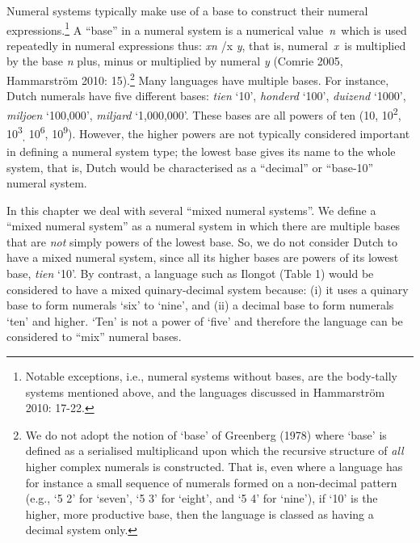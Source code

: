 Numeral systems typically make use of a base to construct their numeral expressions.\footnote{Notable exceptions, i.e., numeral systems without bases, are the body-tally systems mentioned above, and the languages discussed in Hammarstr\"om 2010: 17-22.} A {\textquotedblleft}base{\textquotedblright} in a numeral system is a numerical value~\textit{n~}which is used repeatedly in numeral expressions thus: \textit{xn {\textpm}}/x\textit{ y}, that is, numeral~\textit{x}~is multiplied by the base \textit{n} plus, minus or multiplied by numeral \textit{y} (Comrie 2005, Hammarstr\"om 2010: 15).\footnote{We do not adopt the notion of {\textquoteleft}base{\textquoteright} of Greenberg (1978) where {\textquoteleft}base{\textquoteright} is defined as a serialised multiplicand upon which the recursive structure of \textit{all} higher complex numerals is constructed. That is, even where a language has for instance a small sequence of numerals formed on a non-decimal pattern (e.g., {\textquoteleft}5 2{\textquoteright} for {
\textquoteleft}seven{\textquoteright}, {\textquoteleft}5 3{\textquoteright} for {\textquoteleft}eight{\textquoteright}, and {\textquoteleft}5 4{\textquoteright} for {\textquoteleft}nine{\textquoteright}),  if {\textquoteleft}10{\textquoteright} is the higher, more productive base, then the language is classed as having a decimal system only. } Many languages have multiple bases. For instance, Dutch numerals have five different bases: \textit{tien} {\textquoteleft}10{\textquoteright}, \textit{honderd} {\textquoteleft}100{\textquoteright}, \textit{duizend} {\textquoteleft}1000{\textquoteright}, \textit{miljoen} {\textquoteleft}100,000{\textquoteright}, \textit{miljard} {\textquoteleft}1,000,000{\textquoteright}. These bases are all powers of ten (10, 10\textsuperscript{2}, 10\textsuperscript{3}\textsubscript{,} 10\textsuperscript{6}, 10\textsuperscript{9}). However, the higher powers are not typically considered important in defining a numeral system type; the lowest base gives its name to the whole system, 
that is, Dutch would be characterised as a {\textquotedblleft}decimal{\textquotedblright} or {\textquotedblleft}base-10{\textquotedblright} numeral system. 

In this chapter we deal with several {\textquotedblleft}mixed numeral systems{\textquotedblright}. We define a {\textquotedblleft}mixed numeral system{\textquotedblright} as a numeral system in which there are multiple bases that are \textit{not} simply powers of the lowest base. So, we do not consider Dutch to have a mixed numeral system, since all its higher bases are powers of its lowest base, \textit{tien} {\textquoteleft}10{\textquoteright}. By contrast, a language such as Ilongot (Table 1) would be considered to have a mixed quinary-decimal system because: (i) it uses a quinary base to form numerals {\textquoteleft}six{\textquoteright} to {\textquoteleft}nine{\textquoteright}, and (ii) a decimal base to form numerals {\textquoteleft}ten{\textquoteright} and higher. {\textquoteleft}Ten{\textquoteright} is not a power of {\textquoteleft}five{\textquoteright} and therefore the language can be considered to {\textquotedblleft}mix{\textquotedblright} numeral bases.

